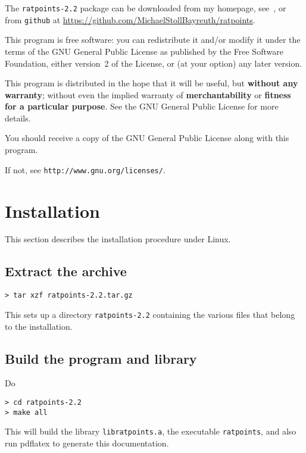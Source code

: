 \documentclass[12pt,a4paper,oneside]{amsart}
\newcommand{\rpversion}{2.2} %
\begin{document}
The \texttt{ratpoints-\rpversion} package can be downloaded from my homepage,
see~\cite{ratpoints}, or from \texttt{github} at
\url{https://github.com/MichaelStollBayreuth/ratpoints}.

This program is free software: you can redistribute it and/or modify
it under the terms of the GNU General Public License as published
by the Free Software Foundation, either version~2 of the License, or
(at your option) any later version.

This program is distributed in the hope that it will be useful,
but \textbf{without any warranty}; without even the implied warranty of
\textbf{merchantability} or \textbf{fitness for a particular purpose}. See the
GNU General Public License for more details.

You should receive a copy of the GNU General Public License
along with this program.

If not, see \texttt{http://www.gnu.org/licenses/}.


\section{Installation}

This section describes the installation procedure under Linux.

\subsection{Extract the archive}

\begin{verbatim}
> tar xzf ratpoints-2.2.tar.gz
\end{verbatim}

This sets up a directory \texttt{ratpoints-\rpversion} containing the various
files that belong to the installation.

\subsection{Build the program and library}

Do

\begin{verbatim}
> cd ratpoints-2.2
> make all
\end{verbatim}

This will build the library \texttt{libratpoints.a}, the executable
\texttt{ratpoints}, and also run pdf\/latex to generate this documentation.
\end{document}
